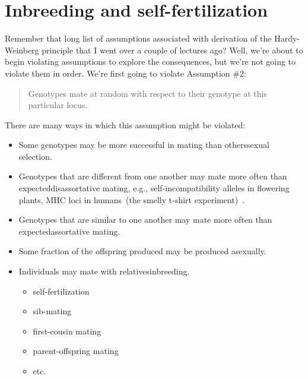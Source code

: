 \chapter{Inbreeding and self-fertilization}

Remember that long list of assumptions associated with derivation of
the Hardy-Weinberg principle that I went over a couple of lectures
ago? Well, we're about to begin violating assumptions to explore the
consequences, but we're not going to violate them in order. We're
first going to violate Assumption \#2:

\begin{quote}
Genotypes mate at random with respect to their genotype at this
particular locus.
\end{quote}

\noindent There are many ways in which this assumption might be
violated:

\begin{itemize}

\item Some genotypes may be more successful in mating than
  others{\dash}sexual selection.

\item Genotypes that are different from one another may mate more
  often than expected{\dash}disassortative mating, e.g.,
  self-incompatibility alleles in flowering plants, MHC loci in
  humans~(the smelly t-shirt
  experiment)~\cite{Wedekind-etal-1995}.

\item Genotypes that are similar to one another may mate more often
  than expected{\dash}assortative mating.

\item Some fraction of the offspring produced may be produced
  asexually.

\item Individuals may mate with
  relatives{\dash}inbreeding.

\begin{itemize}

\item self-fertilization

\item sib-mating

\item first-cousin mating

\item parent-offspring mating

\item etc.

\end{itemize}

\end{itemize}

